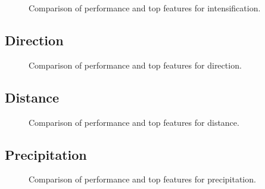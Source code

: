 \begin{figure}[h]
    \centering
    \caption{Comparison of performance and top features for intensification.}
    \label{fig:obs_intensification_summary}
\end{figure}

\subsection{Direction}

\begin{figure}[h]
    \centering
    \caption{Comparison of performance and top features for direction.}
    \label{fig:obs_direction_summary}
\end{figure}

\subsection{Distance}

\begin{figure}[h]
    \centering
    \caption{Comparison of performance and top features for distance.}
    \label{fig:obs_distance_summary}
\end{figure}

\subsection{Precipitation}

\begin{figure}[h]
    \centering
    \caption{Comparison of performance and top features for precipitation.}
    \label{fig:obs_precipitation_summary}
\end{figure}